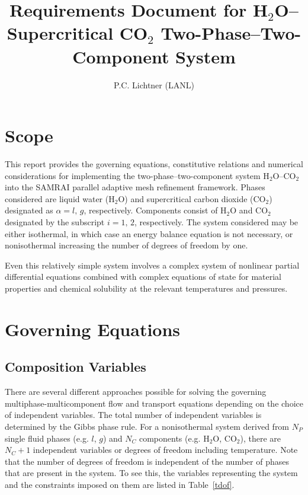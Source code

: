 \documentclass[12pt]{article}
\author{P.C. Lichtner (LANL)}
\title{Requirements Document for H$_2$O--Supercritical CO$_2$ Two-Phase--Two-Component System}
\renewcommand{\a}{{\alpha}}
\begin{document}
\maketitle

\tableofcontents

\section{Scope}

This report provides the governing equations, constitutive relations and numerical considerations for implementing the two-phase--two-component system H$_2$O--CO$_2$ into the SAMRAI parallel adaptive mesh refinement framework. Phases considered are liquid water (H$_2$O) and supercritical carbon dioxide (CO$_2$) designated as $\a = l,\, g$, respectively. Components consist of H$_2$O and CO$_2$ designated by the subscript $i=1,\,2$, respectively. The system considered may be either isothermal, in which case an energy balance equation is not necessary, or nonisothermal increasing the number of degrees of freedom by one.

Even this relatively simple system involves a complex system of nonlinear partial differential equations combined with complex equations of state for material properties and chemical solubility at the relevant temperatures and pressures.

\section{Governing Equations}

\subsection{Composition Variables}

There are several different approaches possible for solving the governing multiphase-multicomponent flow and transport equations depending on the choice of independent variables. The total number of independent variables is determined by the Gibbs phase rule. 
For a nonisothermal system derived from $N_P$ single fluid phases (e.g. $l$, $g$) and $N_C$ components (e.g. H$_2$O, CO$_2$), there are $N_C+1$ independent variables or degrees of freedom including temperature. 
Note that the number of degrees of freedom is independent of the number of  phases that are present in the system. To see this, the variables representing the system and the constraints imposed on them are listed in Table~\ref{tdof}.
\end{document}

